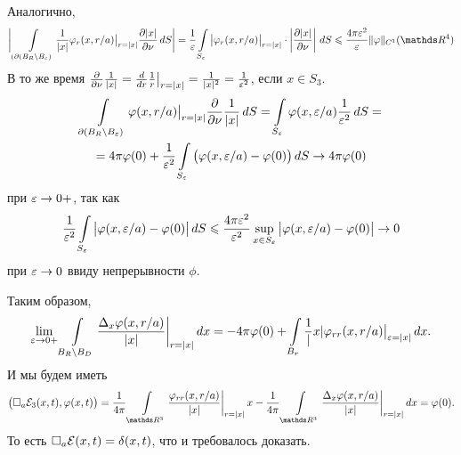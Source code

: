 Аналогично, 
\begin{multline*}
  \bigg|\Gint{(\dl(B_R\dd B_\e)}\frac1{|x|}\phi_r(x,r/a)\big|_{r=|x|}\CP{|x|}{\nu}\,dS\bigg|=
  \frac1\e\Gint{S_\e}\big|\phi_r(x,r/a)\big|_{r=|x|}\cdot\left|\CP{|x|}\nu\right|\,dS\le\frac{4\pi\e^2}\e\|\phi\|_{C^1}(\R^4)
\end{multline*}
В то же время $\frac{\partial }{\partial \nu}\frac1{|x|} = \frac{d}{dr}\frac1r\big|_{r=|x|} = \frac1{|x|^2} = \frac1{\varepsilon^2}$, если $x\in S_3$.
\begin{multline*}
  \int\limits_{\partial(B_R\setminus B_\varepsilon)}\varphi(x,r/a)\big|_{r=|x|}\frac{\partial }{\partial \nu}\frac1{|x|}\,dS = \int\limits_{S_\varepsilon}\varphi(x,\varepsilon/a)\frac1{\varepsilon^2}\,dS =\\
  = 4\pi\varphi(0) + \frac1{\varepsilon^2}\int\limits_{S_\varepsilon}\big(\varphi(x,\varepsilon/a)-\varphi(0)\big)\,dS\rightarrow4\pi\varphi(0)
\end{multline*}
при $\varepsilon\rightarrow0+$, так как
\[
  \frac1{\varepsilon^2}\int\limits_{S_\varepsilon}\big|\varphi(x,\varepsilon/a)-\varphi(0)\big|\,dS\leqslant \frac{4\pi\varepsilon^2}{\varepsilon^2}\sup\limits_{x\in S_\varepsilon}\big|\varphi(x,\varepsilon/a)-\varphi(0)\big|\rightarrow 0
\]
при $\varepsilon\rightarrow0$ ввиду непрерывности $\phi$.

Таким образом,
\[
  \lim\limits_{\varepsilon\rightarrow0+}\int\limits_{B_R\setminus B_D}\frac{\Delta_x\varphi(x,r/a)}{|x|}\bigg|_{r=|x|}\,dx = -4\pi\varphi(0) + \int\limits_{ B_r}\frac1|x|\varphi_{rr}(x,r/a)\big|_{\varepsilon=|x|}\,dx.
\]
И мы будем иметь
\[
  \big(\wave_a\E_3(x,t),\phi(x,t)\big) = \frac 1{4\pi}\Gint{\R^3}\frac{\phi_{rr}(x,r/a)}{|x|}\bigg|_{r=|x|}\,x - 
  \frac1{4\pi}\Gint{\R^3}\frac{\Delta_x\phi(x,r/a)}{|x|}\bigg|_{r=|x|}\,dx = \phi(0).
\]
То есть $\square_a\mathcal E(x,t) = \delta(x,t)$, что и требовалось доказать.
